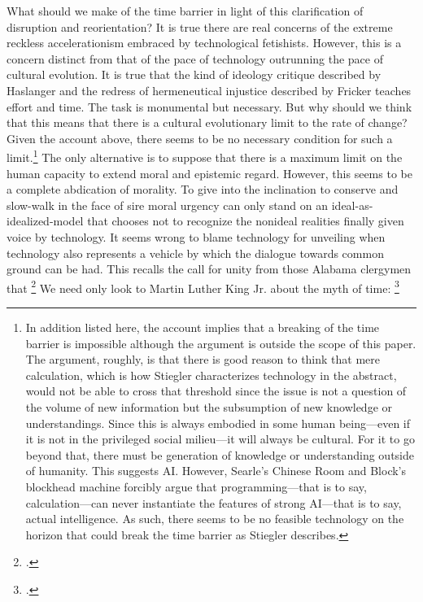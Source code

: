 \documentclass[letterpaper,notitlepage,12pt]{article}
\begin{document}
What should we make of the time barrier in light of this clarification of
disruption and reorientation?
It is true there are real concerns of the extreme reckless accelerationism
embraced by technological fetishists.
However, this is a concern distinct from that of the pace of technology
outrunning the pace of cultural evolution.
It is true that the kind of ideology critique described by Haslanger and the
redress of hermeneutical injustice described by Fricker teaches effort and time.
The task is monumental but necessary.
But why should we think that this means that there is a cultural evolutionary
limit to the rate of change?
Given the account above, there seems to be no necessary condition for such a
limit.\footnote{In addition listed here, the account implies that a breaking of
  the time barrier is impossible although the argument is outside the scope of
  this paper. The argument, roughly, is that there is good reason to think that
mere calculation, which is how Stiegler characterizes technology in the 
abstract, would not be able to cross that threshold since the issue is not a
question of the volume of new information but the subsumption of new knowledge
or understandings. Since this is always embodied in some human being---even if
it is not in the privileged social milieu---it will always be cultural. For it
to go beyond that, there must be generation of knowledge or understanding
outside of humanity. This suggests AI. However, Searle's Chinese Room and
Block's blockhead machine forcibly argue that programming---that is to say,
calculation---can never instantiate the features of strong AI---that is to say,
actual intelligence. As such, there seems to be no feasible technology on the
horizon that could break the time barrier as Stiegler describes.}
The only alternative is to suppose that there is a maximum limit on the human
capacity to extend moral and epistemic regard.
However, this seems to be a complete abdication of morality.
To give into the inclination to conserve and slow-walk in the face of sire moral
urgency can only stand on an ideal-as-idealized-model that chooses not to
recognize the nonideal realities finally given voice by technology.
It seems wrong to blame technology for unveiling when technology also represents
a vehicle by which the dialogue towards common ground can be had.
This recalls the call for unity  from those Alabama clergymen that 
\footcite{noauthor_white_1963}
We need only look to Martin Luther King Jr. about the myth of time:
\footcite{king_letter_2018}
\end{document}
